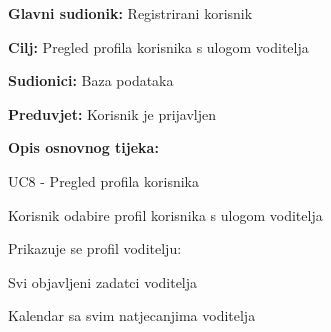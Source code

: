 															
						\noindent {}
					\begin{packed_item}
						
						\item \textbf{Glavni sudionik: }Registrirani korisnik
						\item  \textbf{Cilj:} Pregled profila korisnika s ulogom voditelja
						\item  \textbf{Sudionici:} Baza podataka
						\item  \textbf{Preduvjet:} Korisnik je prijavljen
						\item  \textbf{Opis osnovnog tijeka:}
						
						\item[] \begin{packed_enum}
							
							\item UC8 - Pregled profila korisnika
							\item Korisnik odabire profil korisnika s ulogom voditelja
							\item Prikazuje se profil voditelju:
							\item[] \begin{packed_enum}
								
								\item Svi objavljeni zadatci voditelja
								\item Kalendar sa svim natjecanjima voditelja
								
							\end{packed_enum}
							
						\end{packed_enum}
					\end{packed_item}
					
